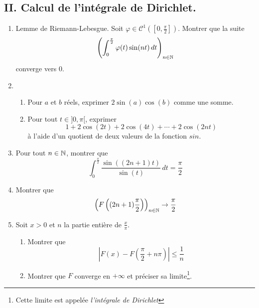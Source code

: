 \subsection*{II. Calcul de l'intégrale de Dirichlet.}
\begin{enumerate}
  \item Lemme de Riemann-Lebesgue. Soit $\varphi\in \mathcal{C}^{1}([0,\frac{\pi}{2}])$. Montrer que la suite
\begin{displaymath}
  \left( \int_0^{\frac{\pi}{2}}\varphi(t)\sin(nt)\, dt\right)_{n\in \mathbb{N}}
\end{displaymath}
converge vers $0$.
 \item 
\begin{enumerate}
  \item Pour $a$ et $b$ réels, exprimer $2\sin(a)\cos(b)$ comme une somme.
  \item Pour tout $t\in ]0,\pi[$, exprimer
\begin{displaymath}
  1 + 2\cos(2t) + 2\cos(4t) + \cdots + 2\cos(2nt)
\end{displaymath}
à l'aide d'un quotient de deux valeurs de la fonction $sin$.
\end{enumerate}
 
  \item Pour tout $n\in \mathbb{N}$, montrer que
\begin{displaymath}
  \int_0^{\frac{\pi}{2}}\frac{\sin\left( (2n+1)t\right) }{\sin(t)}\,dt = \frac{\pi}{2}
\end{displaymath}
  \item Montrer que 
\begin{displaymath}
  \left( F\left( (2n+1)\frac{\pi}{2}\right) \right)_{n\in \mathbb{N}} \rightarrow \frac{\pi}{2}
\end{displaymath}
  \item Soit $x>0$ et $n$ la partie entière de $\frac{x}{\pi}$.
\begin{enumerate}
  \item Montrer que
\begin{displaymath}
  \left|F(x) - F(\frac{\pi}{2}+n\pi)\right| \leq \frac{1}{n} 
\end{displaymath}
  \item Montrer que $F$ converge en $+\infty$ et préciser sa limite\footnote{Cette limite est appelée \emph{l'intégrale de Dirichlet}}.
\end{enumerate}
\end{enumerate}


